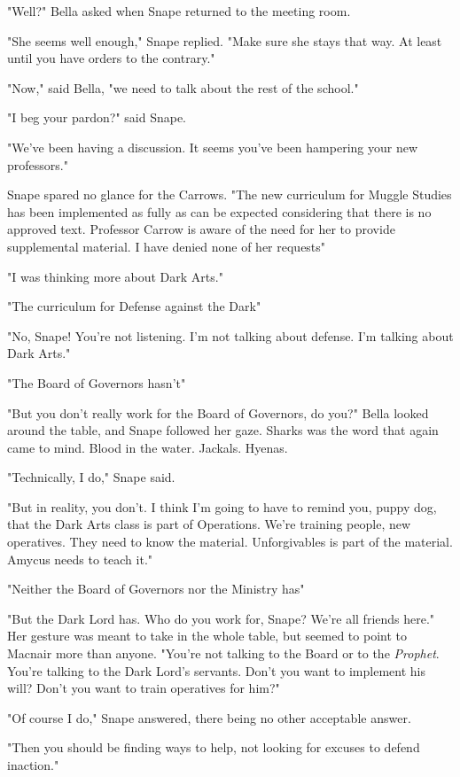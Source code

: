 "Well?" Bella asked when Snape returned to the meeting room.

"She seems well enough," Snape replied. "Make sure she stays that way. At least until you have orders to the contrary."

"Now," said Bella, "we need to talk about the rest of the school."

"I beg your pardon?" said Snape.

"We've been having a discussion. It seems you've been hampering your new professors."

Snape spared no glance for the Carrows. "The new curriculum for Muggle Studies has been implemented as fully as can be expected considering that there is no approved text. Professor Carrow is aware of the need for her to provide supplemental material. I have denied none of her requests{\el}"

"I was thinking more about Dark Arts."

"The curriculum for Defense against the Dark{\el}"

"No, Snape! You're not listening. I'm not talking about defense. I'm talking about Dark Arts."

"The Board of Governors hasn't{\el}"

"But you don't really work for the Board of Governors, do you?" Bella looked around the table, and Snape followed her gaze. Sharks was the word that again came to mind. Blood in the water. Jackals. Hyenas.

"Technically, I do," Snape said.

"But in reality, you don't. I think I'm going to have to remind you, puppy dog, that the Dark Arts class is part of Operations. We're training people, new operatives. They need to know the material. Unforgivables is part of the material. Amycus needs to teach it."

"Neither the Board of Governors nor the Ministry has{\el}"

"But the Dark Lord has. Who do you work for, Snape? We're all friends here." Her gesture was meant to take in the whole table, but seemed to point to Macnair more than anyone. "You're not talking to the Board or to the \emph{Prophet}. You're talking to the Dark Lord's servants. Don't you want to implement his will? Don't you want to train operatives for him?"

"Of course I do," Snape answered, there being no other acceptable answer.

"Then you should be finding ways to help, not looking for excuses to defend inaction."

